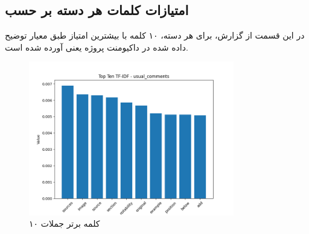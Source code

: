 \clearpage


\clearpage

\subsection{امتیازات کلمات هر دسته بر حسب } 
\par
در این قسمت از گزارش، برای هر دسته، ۱۰ کلمه با بیشترین امتیاز طبق معیار توضیح داده شده در داکیومنت پروژه یعنی  آورده شده است. 


\begin{figure}
  \centering
  \includegraphics[width=0.8\textwidth]{stats/top_ten_TF-IDF_usual_comments.png}
  \caption{۱۰ کلمه برتر جملات }
  \label{fig:unique_common_words_total}
\end{figure}

